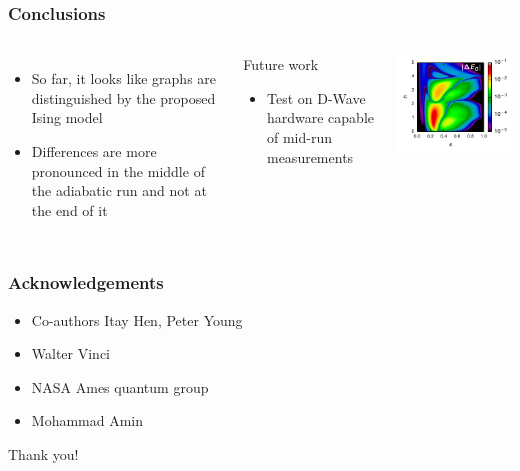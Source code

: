 \documentclass{beamer}
\begin{document}
\begin{frame}
  \frametitle{Conclusions}
  \begin{columns}
    \begin{itemize}
      \item So far, it looks like graphs are distinguished by the proposed
        Ising model
      \item Differences are more pronounced in the middle of the adiabatic run
        and not at the end of it
    \end{itemize}
    \begin{block}{Future work}
      \begin{itemize}
        \item Test on D-Wave hardware capable of mid-run measurements
      \end{itemize}
    \end{block}
    
    \includegraphics{delta-Eg}
  \end{columns}
\end{frame}

\begin{frame}
  \frametitle{Acknowledgements}
  \begin{itemize}
    \item Co-authors Itay Hen, Peter Young
    \item Walter Vinci
    \item NASA Ames quantum group
    \item Mohammad Amin
  \end{itemize}
  \vfill
  \begin{center}
    \huge Thank you!
  \end{center}
\end{frame}
\end{document}
